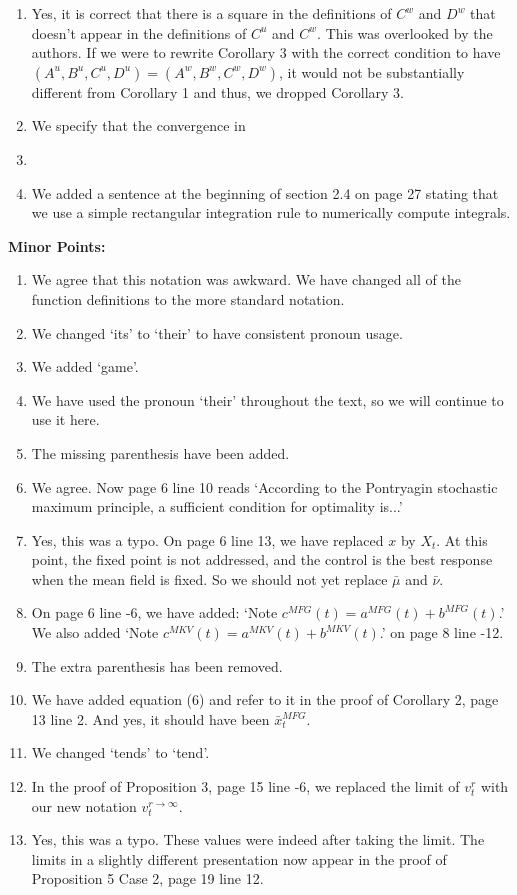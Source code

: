 \documentclass[]{article}
\begin{document}
\begin{enumerate}
	\item Yes, it is correct that there is a square in the definitions of $C^w$ and $D^w$ that doesn't appear in the definitions of $C^u$ and $C^w$. This was overlooked by the authors. If we were to rewrite Corollary 3 with the correct condition to have $(A^u,B^u,C^u,D^u)=(A^w,B^w,C^w,D^w)$, it would not be substantially different from Corollary 1 and thus, we dropped Corollary 3.
	\item We specify that the convergence in 
	\item
	\item We added a sentence at the beginning of section 2.4 on page 27 stating that we use a simple rectangular integration rule to numerically compute integrals.
\end{enumerate}

\hspace{-7mm} \textbf{Minor Points:}
\begin{enumerate}
	\item We agree that this notation was awkward. We have changed all of the function definitions to the more standard notation.
	\item We changed `its' to `their' to have consistent pronoun usage.
	\item We added `game'.
	\item We have used the pronoun `their' throughout the text, so we will continue to use it here.
	\item The missing parenthesis have been added.
	\item We agree. Now page 6 line 10 reads `According to the Pontryagin stochastic maximum principle, a sufficient condition for optimality is...'
	\item Yes, this was a typo. On page 6 line 13, we have replaced $x$ by $X_t$. At this point, the fixed point is not addressed, and the control is the best response when the mean field is fixed. So we should not yet replace $\bar{\mu}$ and $\bar{\nu}$.
	\item On page 6 line -6, we have added: `Note $c^{MFG}(t)=a^{MFG}(t)+b^{MFG}(t)$.' We also added `Note $c^{MKV}(t)=a^{MKV}(t)+b^{MKV}(t)$.' on page 8 line -12.
	\item The extra parenthesis has been removed.
	\item We have added equation (6) and refer to it in the proof of Corollary 2, page 13 line 2. And yes, it should have been $\bar{x}_t^{MFG}$.
	\item We changed `tends' to `tend'.
	\item In the proof of Proposition 3, page 15 line -6, we replaced the limit of $v^r_t$ with our new notation $v^{r \to \infty}_t$.
	\item Yes, this was a typo. These values were indeed after taking the limit. The limits in a slightly different presentation now appear in the proof of Proposition 5 Case 2, page 19 line 12.
\end{enumerate}
\end{document}
